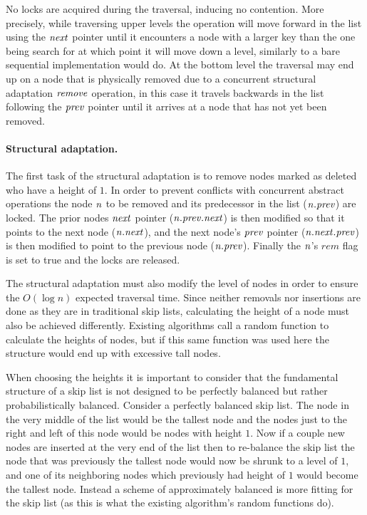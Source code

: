 No locks are acquired during the traversal, inducing no contention.
More precisely, while traversing upper levels the operation will move forward in the list using
the $\ms{next}$ pointer until it encounters a node with a larger key than the one being search for
at which point it will move down a level, similarly to a bare sequential implementation would do.
At the bottom level the traversal may end up on a node that is physically removed due
to a concurrent structural adaptation $\ms{remove}$ operation, in this case it travels backwards in the list
following the $\ms{prev}$ pointer until it arrives at a node that has not yet been removed.

\paragraph{Structural adaptation.}

The first task of the structural adaptation is to remove nodes marked as deleted
who have a height of $1$.
In order to prevent conflicts with concurrent abstract operations
the node $\ms{n}$ to be removed and its predecessor in the list ($\ms{n.prev}$) are locked.
The prior nodes $\ms{next}$ pointer ($\ms{n.prev.next}$) is then modified so that it points to the next 
node ($\ms{n.next}$), and the next node's $\ms{prev}$ pointer ($\ms{n.next.prev}$) is then modified to point to the previous node ($\ms{n.prev}$).
Finally the $\ms{n}$'s $rem$ flag is set to true and the locks are released.

The structural adaptation must also modify the level of nodes in order to ensure
the $O(\log{n})$ expected traversal time.
Since neither removals nor insertions are done as they are in traditional skip lists,
calculating the height of a node must also be achieved differently.
Existing algorithms call a random function to calculate the heights of nodes, but
if this same function was used here the structure would end up with
excessive tall nodes.

When choosing the heights it is important to consider that
the fundamental structure of a skip list is not designed
to be perfectly balanced but rather probabilistically balanced.  
Consider a perfectly balanced skip list.  The node in the very middle of the list would
be the tallest node and the nodes just to the right and left of this
node would be nodes with height $1$.  Now if a couple new nodes are
inserted at the very end of the list then to
re-balance the skip list the node that was previously the tallest
node would now be shrunk to a level of $1$, and one of its
neighboring nodes which previously had height of $1$ would become the tallest node.
Instead a scheme of approximately balanced is more fitting for the skip list
(as this is what the existing algorithm's random functions do).

